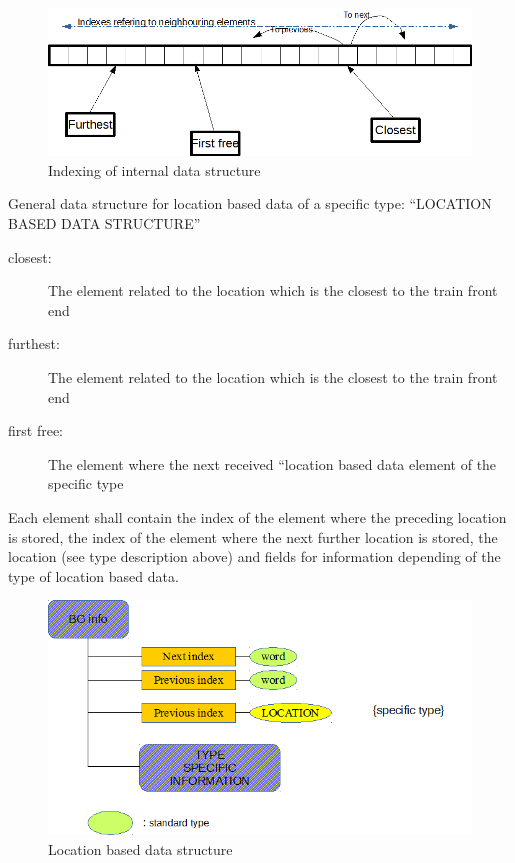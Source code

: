\documentclass{template/openetcs_report}
\begin{document}
\begin{figure}[hbtp]
\centering
\includegraphics[angle=0, scale=0.6] {images/indexing_of_ringbuffer.png}
\caption{Indexing of internal data structure}
\end{figure}


General data structure for location based data of a specific type: “LOCATION BASED DATA STRUCTURE”
\begin{description}
\item[closest:] The element related to the location which is the closest to the train front end
\item[furthest:] The element related to the location which is the closest to the train front end
\item[first free:] The element where the next received “location based data element of the specific type
\end{description}

Each element shall contain the index of the element where the preceding location is stored,  the index of the element where the next further location is stored, the location (see type description above) and fields for information depending of the type of location based data.


\begin{figure}[hbtp]
\centering
\includegraphics[angle=0, scale=0.9] {images/location_based_datastructure.png}
\caption{Location based data structure}
\end{figure}
\end{document}
